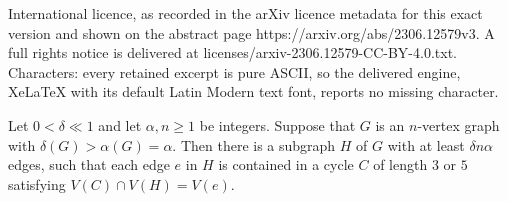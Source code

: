 \documentclass[10pt,a4paper]{amsart}
\begin{document}
International licence, as recorded in the arXiv licence metadata for this exact version and shown on the abstract page https://arxiv.org/abs/2306.12579v3. A full rights notice is delivered at licenses/arxiv-2306.12579-CC-BY-4.0.txt. Characters: every retained excerpt is pure ASCII, so the delivered engine, XeLaTeX with its default Latin Modern text font, reports no missing character.
		\begin{lemma} \label{lem:odd-cycles}
			Let $0 < \delta \ll 1$ and let $\alpha, n \ge 1$ be integers.
			Suppose that $G$ is an $n$-vertex graph with $\delta(G) > \alpha(G) = \alpha$.
			Then there is a subgraph $H$ of $G$ with at least $\delta n \alpha$ edges, such that each edge $e$ in $H$ is contained in a cycle $C$ of length $3$ or $5$ satisfying $V(C) \cap V(H) = V(e)$.
		\end{lemma}
\end{document}
